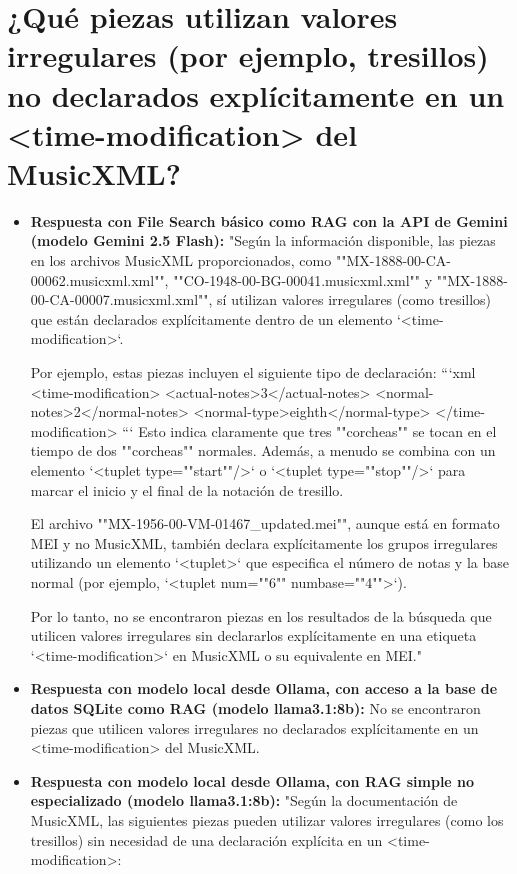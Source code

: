 \begin{itemize}
\end{itemize}

\section{¿Qué piezas utilizan valores irregulares (por ejemplo, tresillos) no declarados explícitamente en un <time-modification> del MusicXML?}
\begin{itemize}
    \item \textbf{Respuesta con File Search básico como RAG con la API de Gemini (modelo Gemini 2.5 Flash):} "Según la información disponible, las piezas en los archivos MusicXML proporcionados, como ""MX-1888-00-CA-00062.musicxml.xml"", ""CO-1948-00-BG-00041.musicxml.xml"" y ""MX-1888-00-CA-00007.musicxml.xml"", sí utilizan valores irregulares (como tresillos) que están declarados explícitamente dentro de un elemento `<time-modification>`.

Por ejemplo, estas piezas incluyen el siguiente tipo de declaración:
```xml
<time-modification>
  <actual-notes>3</actual-notes>
  <normal-notes>2</normal-notes>
  <normal-type>eighth</normal-type>
</time-modification>
```
Esto indica claramente que tres ""corcheas"" se tocan en el tiempo de dos ""corcheas"" normales. Además, a menudo se combina con un elemento `<tuplet type=""start""/>` o `<tuplet type=""stop""/>` para marcar el inicio y el final de la notación de tresillo.

El archivo ""MX-1956-00-VM-01467\_updated.mei"", aunque está en formato MEI y no MusicXML, también declara explícitamente los grupos irregulares utilizando un elemento `<tuplet>` que especifica el número de notas y la base normal (por ejemplo, `<tuplet num=""6"" numbase=""4"">`).

Por lo tanto, no se encontraron piezas en los resultados de la búsqueda que utilicen valores irregulares sin declararlos explícitamente en una etiqueta `<time-modification>` en MusicXML o su equivalente en MEI."
    \item \textbf{Respuesta con modelo local desde Ollama, con acceso a la base de datos SQLite como RAG (modelo llama3.1:8b):} No se encontraron piezas que utilicen valores irregulares no declarados explícitamente en un <time-modification> del MusicXML.
    \item \textbf{Respuesta con modelo local desde Ollama, con RAG simple no especializado (modelo llama3.1:8b):} "Según la documentación de MusicXML, las siguientes piezas pueden utilizar valores irregulares (como los tresillos) sin necesidad de una declaración explícita en un <time-modification>:


\end{itemize}
